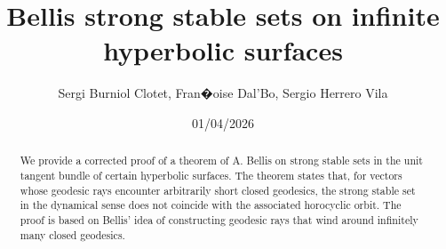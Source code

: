 \documentclass[a4paper,english,reqno]{amsart}
\theoremstyle{definition}
\numberwithin{equation}{section}
\begin{document}
	
	\title[Bellis strong stable sets on 
	infinite hyperbolic surfaces]%
	{Bellis strong stable sets on 
		infinite hyperbolic surfaces}
	
	
	

	
	\author[S. Burniol, F. Dal'Bo, S. Herrero]{ Sergi Burniol Clotet, Fran�oise Dal'Bo, Sergio Herrero Vila}	
	\address{IMERL, CMAT, Universidad de la Rep�blica, IRL-CNRS-IFUMI 2030, Uruguay}
	\address{IRMAR, Universit\'e de Rennes, France, IRL-CNRS-IFUMI 2030, Uruguay}
	\address{IRMAR, Universit\'e de Rennes, Rennes, France}
	
	\date{01/04/2026}
	
	
	\dedicatory{}
	
	\begin{abstract}		
		We provide a corrected proof of a theorem of A. Bellis on strong stable sets in the unit tangent bundle of certain hyperbolic surfaces. The theorem states that, for vectors whose geodesic rays encounter arbitrarily short closed geodesics, the strong stable set in the dynamical sense does not coincide with the associated horocyclic orbit. The proof is based on Bellis' idea of constructing geodesic rays that wind around infinitely many closed geodesics.
	\end{abstract}
	
	\maketitle
	
\end{document}
